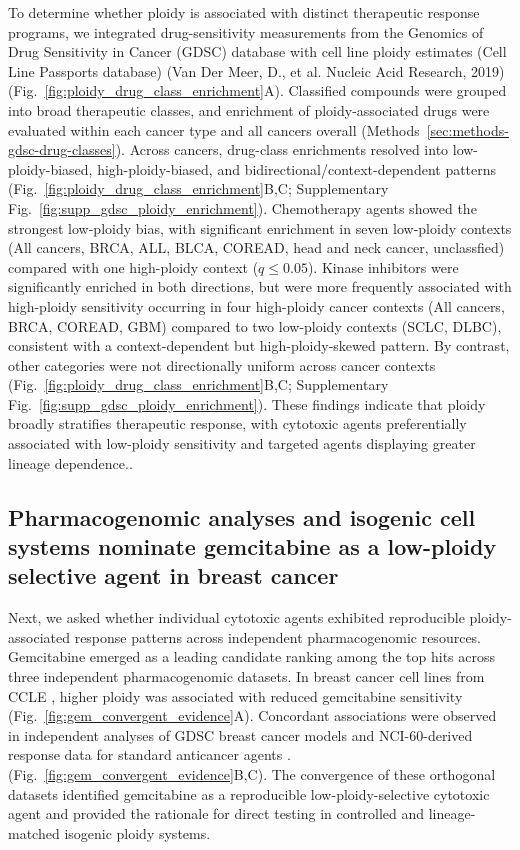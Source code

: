 \documentclass[11pt,notitlepage]{article}
\begin{document}
 To determine whether ploidy is associated with distinct therapeutic response programs, we integrated drug-sensitivity measurements from the Genomics of Drug Sensitivity in Cancer (GDSC) database  \cite{yang_genomics_2013} with cell line ploidy estimates (Cell Line Passports database) \cite{vandermeer_cell_2018} (Van Der Meer, D., et al. Nucleic Acid Research, 2019) (Fig.~\ref{fig:ploidy_drug_class_enrichment}A).
  Classified compounds were grouped into broad therapeutic classes, and enrichment of ploidy-associated drugs were evaluated within each cancer type and all cancers overall (Methods~\ref{sec:methods-gdsc-drug-classes}). Across cancers, drug-class enrichments resolved into low-ploidy-biased, high-ploidy-biased, and bidirectional/context-dependent patterns (Fig.~\ref{fig:ploidy_drug_class_enrichment}B,C; Supplementary Fig.~\ref{fig:supp_gdsc_ploidy_enrichment}). Chemotherapy agents showed the strongest low-ploidy bias, with
  significant enrichment in seven low-ploidy contexts (All cancers, BRCA, ALL, BLCA, COREAD, head and neck cancer, unclassfied) compared with one high-ploidy context (\(q \leq 0.05\)). Kinase inhibitors were significantly enriched in both directions, but were more frequently associated with high-ploidy sensitivity occurring in four high-ploidy cancer contexts (All cancers, BRCA, COREAD, GBM) compared to two low-ploidy contexts (SCLC, DLBC), consistent with a context-dependent but high-ploidy-skewed pattern. By contrast, other categories were not directionally uniform across cancer contexts (Fig.~\ref{fig:ploidy_drug_class_enrichment}B,C; Supplementary Fig.~\ref{fig:supp_gdsc_ploidy_enrichment}). These findings indicate that ploidy broadly stratifies therapeutic response, with cytotoxic agents preferentially associated with low-ploidy sensitivity and targeted agents displaying greater lineage dependence..


\subsection*{Pharmacogenomic analyses and isogenic cell systems nominate gemcitabine as a low-ploidy selective agent in breast cancer}

Next, we asked whether individual cytotoxic agents exhibited reproducible ploidy-associated response
  patterns across independent pharmacogenomic resources. Gemcitabine emerged as a leading candidate ranking among the top hits across three independent pharmacogenomic datasets. In breast cancer cell lines from CCLE \cite{ghandi_next-generation_2019, kimmel_integrating_2020}, higher
  ploidy was associated with reduced gemcitabine sensitivity (Fig.~\ref{fig:gem_convergent_evidence}A). Concordant associations were  observed in independent analyses of GDSC breast cancer models and NCI-60-derived response data for standard anticancer agents \cite{yang_genomics_2013} \cite{choudhary_identification_2016}. (Fig.~\ref{fig:gem_convergent_evidence}B,C). The convergence of these orthogonal datasets identified gemcitabine as a reproducible low-ploidy-selective cytotoxic agent and provided the rationale for direct testing in controlled and lineage-matched isogenic ploidy systems.
\end{document}
